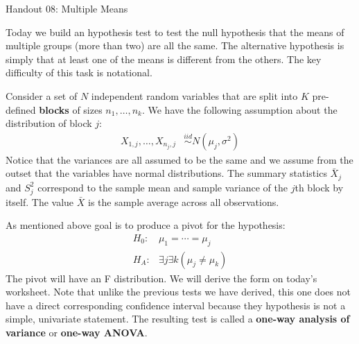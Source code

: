 \documentclass{tufte-handout}
\newcommand{\iid}{\stackrel{iid}{\sim}}
\begin{document}
\justify

{\LARGE Handout 08: Multiple Means}

\vspace*{18pt}

\noindent
Today we build an hypothesis test to test the null hypothesis that the
means of multiple groups (more than two) are all the same. The alternative
hypothesis is simply that at least one of the means is different from the
others. The key difficulty of this task is notational. 

Consider a set of $N$ independent random variables that are split into $K$ 
pre-defined \textbf{blocks} of sizes $n_1, \ldots, n_k$. We have the 
following assumption about the distribution of block $j$:
\begin{align*}
X_{1, j}, \ldots, X_{n_j, j} &\iid N(\mu_j, \sigma^2)
\end{align*}
Notice that the variances are all assumed to be the same and we assume from
the outset that the variables have normal distributions. The summary
statistics $\bar{X}_j$ and $S^2_j$ correspond to the sample mean and sample
variance of the $j$th block by itself. The value $\bar{X}$ is the sample
average across all observations.

As mentioned above goal is to produce a pivot for the hypothesis:
\begin{align*}
H_0:& \mu_1 = \cdots = \mu_j \\
H_A:& \exists j \exists k (\mu_j \neq \mu_k)
\end{align*}
The pivot will have an F distribution. We will derive the form on today's
worksheet. Note that unlike the previous tests we have derived, this one
does not have a direct corresponding confidence interval because they 
hypothesis is not a simple, univariate statement. The resulting test is
called a \textbf{one-way analysis of variance} or \textbf{one-way ANOVA}.
\end{document}
